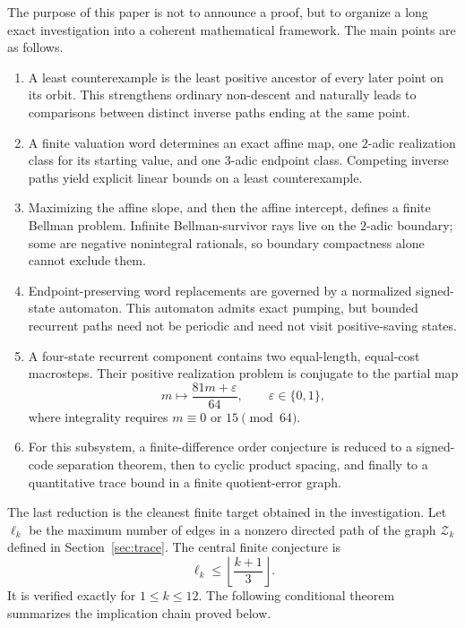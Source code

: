 \documentclass[11pt,reqno]{amsart}
\numberwithin{equation}{section}
\theoremstyle{definition}
\theoremstyle{remark}
\newcommand{\eps}{\varepsilon}
\begin{document}
The purpose of this paper is not to announce a proof, but to organize a long exact investigation into a coherent mathematical framework.  The main points are as follows.

\begin{enumerate}[label=\textup{(\roman*)},leftmargin=2.3em]
\item A least counterexample is the least positive ancestor of every later point on its orbit.  This strengthens ordinary non-descent and naturally leads to comparisons between distinct inverse paths ending at the same point.
\item A finite valuation word determines an exact affine map, one $2$-adic realization class for its starting value, and one $3$-adic endpoint class.  Competing inverse paths yield explicit linear bounds on a least counterexample.
\item Maximizing the affine slope, and then the affine intercept, defines a finite Bellman problem.  Infinite Bellman-survivor rays live on the $2$-adic boundary; some are negative nonintegral rationals, so boundary compactness alone cannot exclude them.
\item Endpoint-preserving word replacements are governed by a normalized signed-state automaton.  This automaton admits exact pumping, but bounded recurrent paths need not be periodic and need not visit positive-saving states.
\item A four-state recurrent component contains two equal-length, equal-cost macrosteps.  Their positive realization problem is conjugate to the partial map
\begin{equation}\label{eq:8164intro}
 m\longmapsto \frac{81m+\eps}{64},\qquad \eps\in\{0,1\},
\end{equation}
where integrality requires $m\equiv0$ or $15\pmod{64}$.
\item For this subsystem, a finite-difference order conjecture is reduced to a signed-code separation theorem, then to cyclic product spacing, and finally to a quantitative trace bound in a finite quotient-error graph.
\end{enumerate}

The last reduction is the cleanest finite target obtained in the investigation.  Let $\ell_k$ be the maximum number of edges in a nonzero directed path of the graph $\mathcal Z_k$ defined in Section~\ref{sec:trace}.  The central finite conjecture is
\begin{equation}\label{eq:ZTintro}
 \ell_k\le \left\lfloor\frac{k+1}{3}\right\rfloor.
\end{equation}
It is verified exactly for $1\le k\le12$.  The following conditional theorem summarizes the implication chain proved below.
\end{document}
